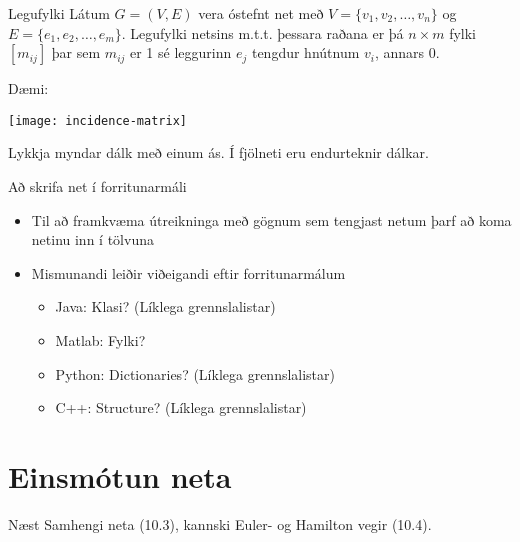 \documentclass[handout]{beamer}
\begin{document}
\begin{frame}{Legufylki}
Látum $G = (V, E)$ vera óstefnt net með $V = \{v_1, v_2, \ldots, v_n\}$ og $E = \{e_1, e_2, \ldots, e_m\}$. Legufylki netsins m.t.t. þessara raðana er þá $n \times m$ fylki $[m_{ij}]$ þar sem $m_{ij}$ er 1 sé leggurinn $e_j$ tengdur hnútnum $v_i$, annars 0.

Dæmi:
\begin{center}
\texttt{[image: incidence-matrix]}
\end{center}
Lykkja myndar dálk með einum ás. Í fjölneti eru endurteknir dálkar.
\end{frame}


\begin{frame}{Að skrifa net í forritunarmáli}
\begin{itemize}
 \item Til að framkvæma útreikninga með gögnum sem tengjast netum þarf að koma netinu inn í tölvuna
 \item Mismunandi leiðir viðeigandi eftir forritunarmálum
 \begin{itemize}
  \item Java: Klasi? (Líklega grennslalistar)
  \item Matlab: Fylki? 
  \item Python: Dictionaries? (Líklega grennslalistar)
  \item C++: Structure? (Líklega grennslalistar)
 \end{itemize}
\end{itemize}
\end{frame}

\section{Einsmótun neta}

\begin{frame}{Næst}
Samhengi neta (10.3), kannski Euler- og Hamilton vegir (10.4).
\end{frame}
\end{document}
